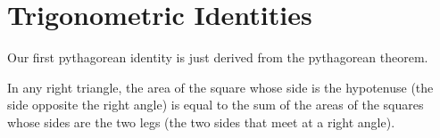 \section{Trigonometric Identities}
Our first pythagorean identity is just derived from the pythagorean theorem.
\begin{theorem}
  In any right triangle, the area of the square whose side is the hypotenuse (the side opposite the right angle) is equal to the sum of the areas of the squares whose sides are the two legs (the two sides that meet at a right angle).
  \label{th:pythagoras}
\end{theorem}
\begin{figure}[h]
  \begin{center}
    \hspace{0.1\textwidth}
  \end{center}
\end{figure}
